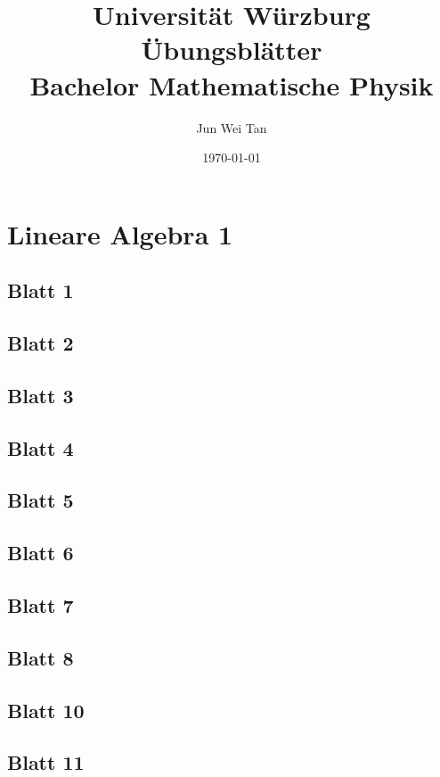 \documentclass{tuftebook}
\numberwithin{Theorem}{chapter}
\theoremstyle{definition}
\theoremstyle{definition}
\begin{document}
	\title{Universit\"{a}t W\"{u}rzburg \"{U}bungsbl\"{a}tter\\Bachelor Mathematische Physik}
	\author{Jun Wei Tan}
	\date{\today}
	\maketitle
	\tableofcontents

\chapter{Lineare Algebra 1}
\section{Blatt 1}

\section{Blatt 2}

\section{Blatt 3}

\section{Blatt 4}

\section{Blatt 5}

\section{Blatt 6}

\section{Blatt 7}

\section{Blatt 8}

\section{Blatt 10}

\section{Blatt 11}
%
\end{document}

